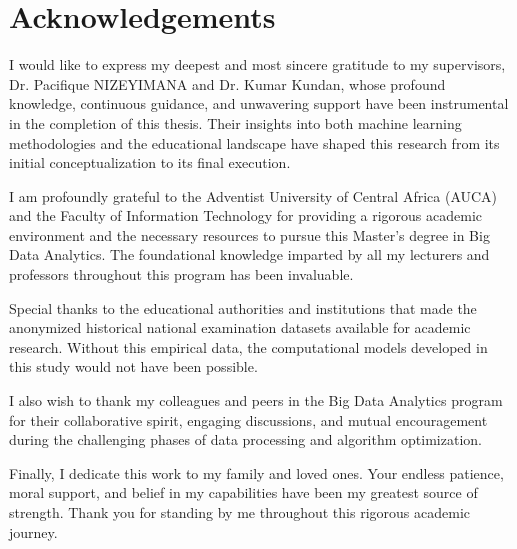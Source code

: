 \section*{Acknowledgements}
\enlargethispage{3\baselineskip}

I would like to express my deepest and most sincere gratitude to my supervisors, Dr. Pacifique NIZEYIMANA and Dr. Kumar Kundan, whose profound knowledge, continuous guidance, and unwavering support have been instrumental in the completion of this thesis. Their insights into both machine learning methodologies and the educational landscape have shaped this research from its initial conceptualization to its final execution. 

I am profoundly grateful to the Adventist University of Central Africa (AUCA) and the Faculty of Information Technology for providing a rigorous academic environment and the necessary resources to pursue this Master's degree in Big Data Analytics. The foundational knowledge imparted by all my lecturers and professors throughout this program has been invaluable.

Special thanks to the educational authorities and institutions that made the anonymized historical national examination datasets available for academic research. Without this empirical data, the computational models developed in this study would not have been possible.

I also wish to thank my colleagues and peers in the Big Data Analytics program for their collaborative spirit, engaging discussions, and mutual encouragement during the challenging phases of data processing and algorithm optimization.

Finally, I dedicate this work to my family and loved ones. Your endless patience, moral support, and belief in my capabilities have been my greatest source of strength. Thank you for standing by me throughout this rigorous academic journey.